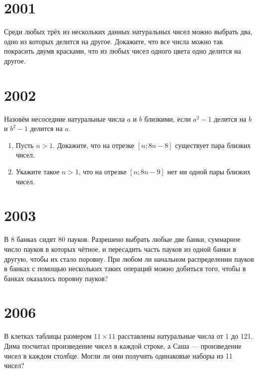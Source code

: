 \documentclass[11pt, a4paper]{template}
\begin{document}
\chapter{2001}

\begin{exercise}[M1756]
Среди любых трёх из нескольких данных натуральных чисел можно выбрать два, одно из которых делится на другое. Докажите, что все числа можно так покрасить двумя красками, что из любых чисел одного цвета одно делится на другое.
\end{exercise}

\chapter{2002}

\begin{exercise}
Назовём несоседние натуральные числа $a$ и $b$ близкими, если $a^{2} - 1$ делится на $b$ и $b^{2} - 1$ делится на $a$.
\begin{enumerate}
\item Пусть $n > 1$. Докажите, что на отрезке $[n; 8n - 8]$ существует пара близких чисел.
\item Укажите такое $n > 1$, что на отрезке $[n; 8n - 9]$ нет ни одной пары близких чисел.
\end{enumerate} 
\end{exercise}

\chapter{2003}

\begin{exercise}[M1847]
В 8 банках сидят 80 пауков. Разрешено выбрать любые две банки, суммарное число пауков в которых чётное, и пересадить часть пауков из одной банки в другую, чтобы их стало поровну. При любом ли начальном распределении пауков в банках с помощью нескольких таких операций можно добиться того, чтобы в банках оказалось поровну пауков?
\end{exercise}

\chapter{2006}

\begin{exercise}[M1981]
В клетках таблицы размером $11 \times 11$ расставлены натуральные числа от 1 до 121. Дима посчитал произведение чисел в каждой строке, а Саша — произведение чисел в каждом столбце. Могли ли они получить одинаковые наборы из 11 чисел?
\end{exercise}
\end{document}
